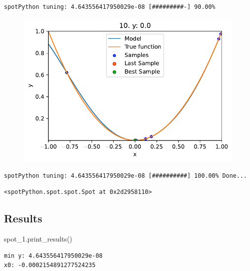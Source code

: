 \documentclass[
  letterpaper,
  DIV=11,
  numbers=noendperiod]{scrreprt}
\newenvironment{Shaded}{\begin{snugshade}}{\end{snugshade}}
\newcommand{\NormalTok}[1]{\textcolor[rgb]{0.00,0.23,0.31}{#1}}
\begin{document}
\begin{verbatim}
spotPython tuning: 4.643556417950029e-08 [#########-] 90.00% 
\end{verbatim}

\begin{figure}[H]

{\centering \includegraphics{010_num_spot_sklearn_surrogate_files/figure-pdf/cell-21-output-14.pdf}

}

\end{figure}

\begin{verbatim}
spotPython tuning: 4.643556417950029e-08 [##########] 100.00% Done...
\end{verbatim}

\begin{verbatim}
<spotPython.spot.spot.Spot at 0x2d2958110>
\end{verbatim}

\hypertarget{results-2}{%
\subsection{Results}\label{results-2}}

\begin{Shaded}
\begin{Highlighting}[]
\NormalTok{spot\_1.print\_results()}
\end{Highlighting}
\end{Shaded}

\begin{verbatim}
min y: 4.643556417950029e-08
x0: -0.0002154891277524235
\end{verbatim}
\end{document}
